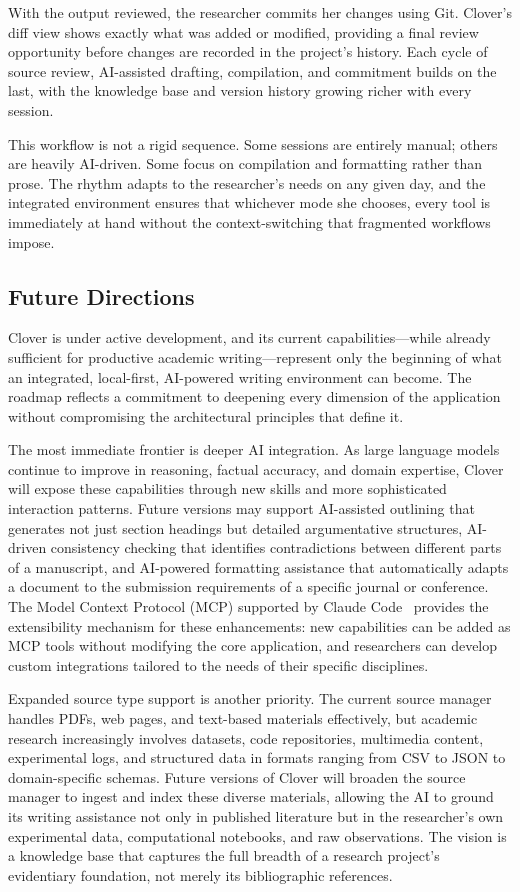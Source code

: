 \documentclass[a4paper,11pt]{article}
\begin{document}
With the output reviewed, the researcher commits her changes using Git. Clover's diff view shows exactly what was added or modified, providing a final review opportunity before changes are recorded in the project's history. Each cycle of source review, AI-assisted drafting, compilation, and commitment builds on the last, with the knowledge base and version history growing richer with every session.

This workflow is not a rigid sequence. Some sessions are entirely manual; others are heavily AI-driven. Some focus on compilation and formatting rather than prose. The rhythm adapts to the researcher's needs on any given day, and the integrated environment ensures that whichever mode she chooses, every tool is immediately at hand without the context-switching that fragmented workflows impose.

\subsection{Future Directions}

Clover is under active development, and its current capabilities---while already sufficient for productive academic writing---represent only the beginning of what an integrated, local-first, AI-powered writing environment can become. The roadmap reflects a commitment to deepening every dimension of the application without compromising the architectural principles that define it.

The most immediate frontier is deeper AI integration. As large language models continue to improve in reasoning, factual accuracy, and domain expertise, Clover will expose these capabilities through new skills and more sophisticated interaction patterns. Future versions may support AI-assisted outlining that generates not just section headings but detailed argumentative structures, AI-driven consistency checking that identifies contradictions between different parts of a manuscript, and AI-powered formatting assistance that automatically adapts a document to the submission requirements of a specific journal or conference. The Model Context Protocol (MCP) supported by Claude Code~\cite{ClaudeCode} provides the extensibility mechanism for these enhancements: new capabilities can be added as MCP tools without modifying the core application, and researchers can develop custom integrations tailored to the needs of their specific disciplines.

Expanded source type support is another priority. The current source manager handles PDFs, web pages, and text-based materials effectively, but academic research increasingly involves datasets, code repositories, multimedia content, experimental logs, and structured data in formats ranging from CSV to JSON to domain-specific schemas. Future versions of Clover will broaden the source manager to ingest and index these diverse materials, allowing the AI to ground its writing assistance not only in published literature but in the researcher's own experimental data, computational notebooks, and raw observations. The vision is a knowledge base that captures the full breadth of a research project's evidentiary foundation, not merely its bibliographic references.
\end{document}
